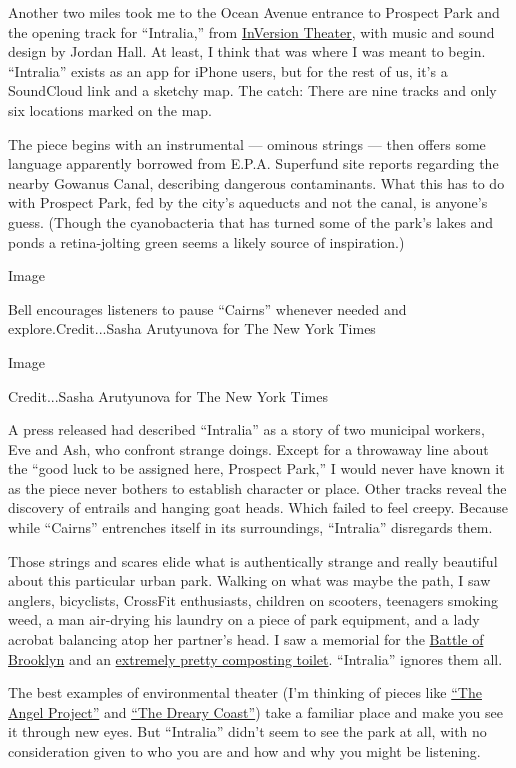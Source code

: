 Another two miles took me to the Ocean Avenue entrance to Prospect Park
and the opening track for ``Intralia,'' from
\href{https://www.inversiontheatre.com/}{InVersion Theater}, with music
and sound design by Jordan Hall. At least, I think that was where I was
meant to begin. ``Intralia'' exists as an app for iPhone users, but for
the rest of us, it's a SoundCloud link and a sketchy map. The catch:
There are nine tracks and only six locations marked on the map.

The piece begins with an instrumental --- ominous strings --- then
offers some language apparently borrowed from E.P.A. Superfund site
reports regarding the nearby Gowanus Canal, describing dangerous
contaminants. What this has to do with Prospect Park, fed by the city's
aqueducts and not the canal, is anyone's guess. (Though the
cyanobacteria that has turned some of the park's lakes and ponds a
retina-jolting green seems a likely source of inspiration.)

Image

Bell encourages listeners to pause ``Cairns'' whenever needed and
explore.Credit...Sasha Arutyunova for The New York Times

Image

Credit...Sasha Arutyunova for The New York Times

A press released had described ``Intralia'' as a story of two municipal
workers, Eve and Ash, who confront strange doings. Except for a
throwaway line about the ``good luck to be assigned here, Prospect
Park,'' I would never have known it as the piece never bothers to
establish character or place. Other tracks reveal the discovery of
entrails and hanging goat heads. Which failed to feel creepy. Because
while ``Cairns'' entrenches itself in its surroundings, ``Intralia''
disregards them.

Those strings and scares elide what is authentically strange and really
beautiful about this particular urban park. Walking on what was maybe
the path, I saw anglers, bicyclists, CrossFit enthusiasts, children on
scooters, teenagers smoking weed, a man air-drying his laundry on a
piece of park equipment, and a lady acrobat balancing atop her partner's
head. I saw a memorial for the
\href{https://www.nycgovparks.org/parks/B073/highlights/19641}{Battle of
Brooklyn} and an
\href{https://www.prospectpark.org/news-events/news/alliance-transforms-historic-wellhouse/}{extremely
pretty composting toilet}. ``Intralia'' ignores them all.

The best examples of environmental theater (I'm thinking of pieces like
\href{https://www.nytimes3xbfgragh.onion/2003/07/03/theater/theater-that-uses-the-city-as-a-stage.html}{``The
Angel Project''} and
\href{https://www.nytimes3xbfgragh.onion/2014/10/31/theater/the-dreary-coast-on-the-banks-of-the-gowanus-canal.html}{``The
Dreary Coast''}) take a familiar place and make you see it through new
eyes. But ``Intralia'' didn't seem to see the park at all, with no
consideration given to who you are and how and why you might be
listening.

